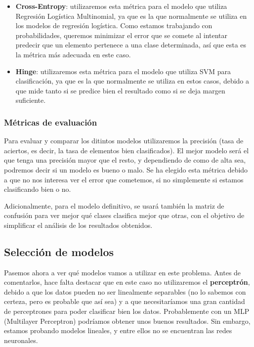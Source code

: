 \documentclass[11pt,a4paper]{article}
\begin{document}
\begin{itemize}
\item
  \textbf{Cross-Entropy}: utilizaremos esta métrica para el modelo que
  utiliza Regresión Logística Multinomial, ya que es la que normalmente
  se utiliza en los modelos de regresión logística. Como estamos
  trabajando con probabilidades, queremos minimizar el error que se
  comete al intentar predecir que un elemento pertenece a una clase
  determinada, así que esta es la métrica más adecuada en este caso.
\item
  \textbf{Hinge}: utilizaremos esta métrica para el modelo que utiliza
  SVM para clasificación, ya que es la que normalmente se utiliza en
  estos casos, debido a que mide tanto si se predice bien el resultado
  como si se deja margen suficiente.
\end{itemize}

\subsubsection{Métricas de
evaluación}\label{muxe9tricas-de-evaluaciuxf3n}

Para evaluar y comparar los ditintos modelos utilizaremos la precisión
(tasa de aciertos, es decir, la tasa de elementos bien clasificados). El
mejor modelo será el que tenga una precisión mayor que el resto, y
dependiendo de como de alta sea, podremos decir si un modelo es bueno o
malo. Se ha elegido esta métrica debido a que no nos interesa ver el
error que cometemos, si no simplemente si estamos clasificando bien o
no.

Adicionalmente, para el modelo definitivo, se usará también la matriz de
confusión para ver mejor qué clases clasifica mejor que otras, con el
objetivo de simplificar el análisis de los resultados obtenidos.

    \subsection{Selección de modelos}\label{selecciuxf3n-de-modelos}

Pasemos ahora a ver qué modelos vamos a utilizar en este problema. Antes
de comentarlos, hace falta destacar que en este caso no utilizaremos el
\textbf{perceptrón}, debido a que los datos pueden no ser linealmente
separables (no lo sabemos con certeza, pero es probable que así sea) y a
que necesitaríamos una gran cantidad de perceptrones para poder
clasificar bien los datos. Probablemente con un MLP (Multilayer
Perceptron) podríamos obtener unos buenos resultados. Sin embargo,
estamos probando modelos lineales, y entre ellos no se encuentran las
redes neuronales.
\end{document}
